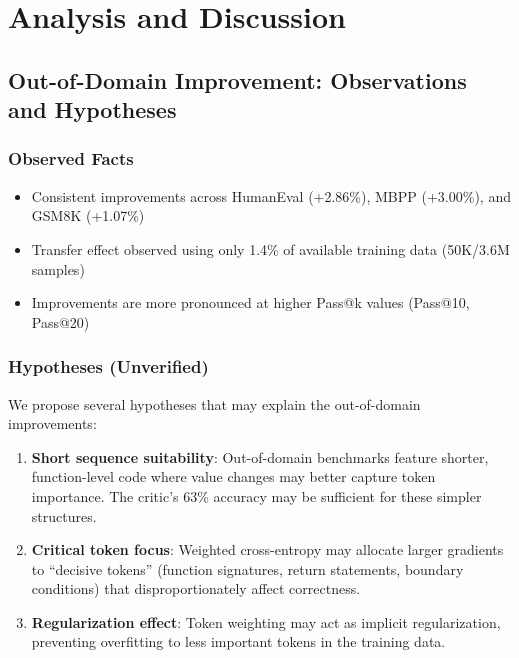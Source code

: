 \section{Analysis and Discussion}
\label{sec:analysis}

\subsection{Out-of-Domain Improvement: Observations and Hypotheses}

\subsubsection{Observed Facts}

\begin{itemize}[nosep]
    \item Consistent improvements across HumanEval (+2.86\%), MBPP (+3.00\%), and GSM8K (+1.07\%)
    \item Transfer effect observed using only 1.4\% of available training data (50K/3.6M samples)
    \item Improvements are more pronounced at higher Pass@k values (Pass@10, Pass@20)
\end{itemize}

\subsubsection{Hypotheses (Unverified)}

We propose several hypotheses that may explain the out-of-domain improvements:

\begin{enumerate}[nosep]
    \item \textbf{Short sequence suitability}: Out-of-domain benchmarks feature shorter, function-level code where value changes may better capture token importance. The critic's 63\% accuracy may be sufficient for these simpler structures.

    \item \textbf{Critical token focus}: Weighted cross-entropy may allocate larger gradients to ``decisive tokens'' (function signatures, return statements, boundary conditions) that disproportionately affect correctness.

    \item \textbf{Regularization effect}: Token weighting may act as implicit regularization, preventing overfitting to less important tokens in the training data.
\end{enumerate}

